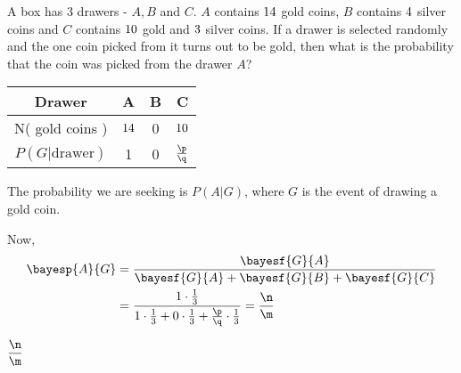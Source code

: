 

\ADD\vx\vy\vz
\FRACTIONSIMPLIFY\vx\vz\p\q
{}\p\q\m\n

\question[2] A box has 3 drawers - $A,B$ and $C$. $A$ contains $14$ gold coins, 
$B$ contains $4$ silver coins
and $C$ contains $10$ gold and $3$ silver coins. 
If a drawer is selected randomly and the one coin picked from it turns out to be gold, 
then what is the probability that the coin was picked from the drawer $A$?

\watchout

\ifprintanswers
    \begin{tabular}{cccc}
       \toprule
       Drawer & A & B & C \\
       \midrule
       N( gold coins ) & $14$ & 0 & $10$ \\
       $P( G\vert\text{drawer})$ & 1 & 0 & $\frac\p\q$ \\
       \bottomrule
    \end{tabular}
\fi 

\begin{solution}[\halfpage]
    The probability we are seeking is $P(A \vert G)$, where $G$ is the event of drawing
    a gold coin.
    
    Now, 
    \begin{align}
       \bayesp{A}{G} &= \dfrac{\bayesf{G}{A}}{\bayesf{G}{A} + \bayesf{G}{B} + \bayesf{G}{C}} \\
          &= \dfrac{1\cdot\frac{1}{3}}{1\cdot\frac{1}{3} + 0\cdot\frac{1}{3} 
          + \frac\p\q\cdot\frac{1}{3}} =\dfrac\n\m
    \end{align}
\end{solution}

\ifprintanswers\begin{codex}$\dfrac\n\m$\end{codex}\fi
